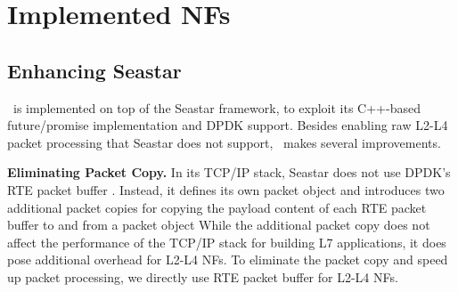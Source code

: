 \section{Implemented NFs}
\label{sec:netstar-implementation}


\subsection{Enhancing Seastar}

\netstar~is implemented on top of the Seastar framework, to exploit its C++-based future/promise implementation and DPDK support.
 Besides enabling raw L2-L4 packet processing that Seastar does not support, \netstar~makes several improvements.

 \noindent\textbf{Eliminating Packet Copy.} In its TCP/IP stack, Seastar does not use DPDK's RTE packet buffer \cite{dpdk}. Instead, it defines its own packet object and introduces two additional packet copies for copying the payload content of each RTE packet buffer to and from a packet object %
  While the additional packet copy does not affect the performance of the TCP/IP stack for building L7 applications, it does pose additional overhead for L2-L4 NFs. To eliminate the packet copy and speed up packet processing, we directly use RTE packet buffer for L2-L4 NFs. %


